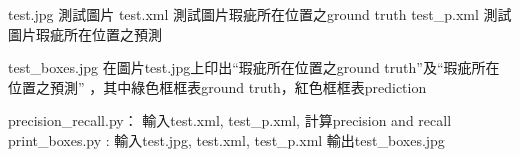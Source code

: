 test.jpg 測試圖片
test.xml  測試圖片瑕疵所在位置之ground truth
test_p.xml  測試圖片瑕疵所在位置之預測

test_boxes.jpg 在圖片test.jpg上印出“瑕疵所在位置之ground truth”及“瑕疵所在位置之預測” ，其中綠色框框表ground truth，紅色框框表prediction

precision_recall.py： 輸入test.xml, test_p.xml, 計算precision and recall
print_boxes.py :  輸入test.jpg, test.xml, test_p.xml  輸出test_boxes.jpg  